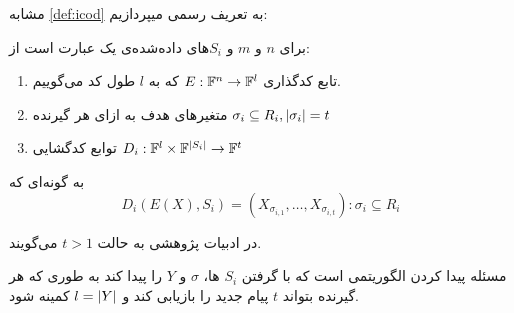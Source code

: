 مشابه
\autoref{def:icod}
به تعریف رسمی
\picodt
میپردازیم:
\begin{definition}[\picodt]
    \label{def:picodt}
    برای
    $n$
    و
    $m$
    و
    $S_i$های داده‌شده‌ی یک
    \picodt
    عبارت است از:
    \begin{enumerate}
        \item
        تابع کدگذاری
        $E: \mathbb{F}^n \rightarrow \mathbb{F}^l$
        که به
        $l$
        طول کد می‌گوییم.
        \item متغیرهای هدف به ازای هر گیرنده
        $\sigma_i \subseteq R_i,  \left|{\sigma_i}\right| = t$
        \item
        توابع کدگشایی
        $D_i: \mathbb{F}^l \times \mathbb{F}^{\left|{S_i}\right|} \rightarrow \mathbb{F}^t$
    \end{enumerate}
    به گونه‌ای که
    $$D_i(E(X), S_i) = (X_{\sigma_{i,1}}, \ldots, X_{\sigma_{i,t}}): \sigma_i \subseteq R_i$$
\end{definition}

در ادبیات پژوهشی به حالت
$t > 1$
می‌گویند.

مسئله
\picodt
پیدا کردن الگوریتمی است که با گرفتن
$S_i$
ها،
$\sigma$
و
$Y$
را پیدا کند به طوری که هر گیرنده بتواند
$t$
پیام جدید را بازیابی کند و
$l = \left|{Y}\right|$
کمینه شود.

